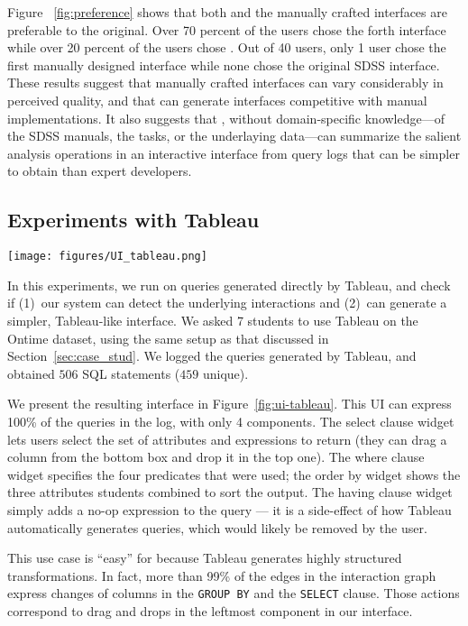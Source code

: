 Figure ~\ref{fig:preference} shows that both \sys and the manually crafted interfaces are preferable to the original. Over 70 percent of the users chose the forth interface while over 20 percent of the users chose \sys.   Out of 40 users, only 1 user chose the first manually designed interface while none chose the original SDSS interface. These results suggest that manually crafted interfaces can vary considerably in perceived quality, and that \sys can generate interfaces competitive with manual implementations.  It also suggests that \sys, without domain-specific knowledge---of the SDSS manuals, the tasks, or the underlaying data---can summarize the salient analysis operations in an interactive interface from query logs that can be simpler to obtain than expert developers.

\subsection{Experiments with Tableau}
\begin{figure*}[t!]
    \centering
    \texttt{[image: figures/UI\_tableau.png]}
    \caption{Interface generated for the Tableau log.}
    \label{fig:ui-tableau}
\end{figure*}

In this experiments, we run \sys{} on queries generated directly by Tableau, and check if (1)~our system can detect the underlying interactions and (2)~can generate a simpler, Tableau-like interface. We asked 7 students to use Tableau on the Ontime dataset, using the same setup as that discussed in Section~\ref{sec:case_stud}. We logged the queries generated by Tableau, and obtained $506$ SQL statements ($459$ unique).

 We present the resulting interface in Figure~\ref{fig:ui-tableau}. This UI can express 100\% of the queries in the log, with only 4 components. The select clause widget lets users select the set of attributes and expressions to return (they can drag a column from the bottom box and drop it in the top one). The where clause widget specifies the four predicates that were used; the order by widget shows the three attributes students combined to sort the output. The having clause widget simply adds a no-op expression to the query --- it is a side-effect of how Tableau automatically generates queries, which would likely be removed by the user.

 This use case is ``easy'' for \sys{} because Tableau generates highly structured transformations. In fact, more than 99\% of the edges in the interaction graph express changes of columns in the \texttt{GROUP BY} and the \texttt{SELECT} clause. Those actions correspond to drag and drops in the leftmost component in our interface.